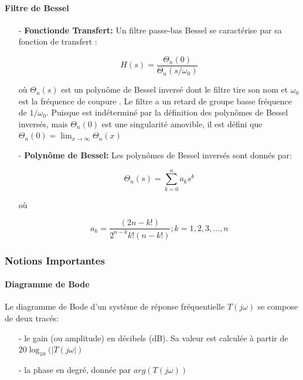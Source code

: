 \documentclass[conference,onecolumn]{IEEEtran}
\begin{document}
\paragraph{Filtre de Bessel}
\hfill
\medskip
\begin{itemize}
    \item[-] \textbf{Fonctionde Transfert:}
    Un filtre passe-bas Bessel se caractérise par sa fonction de transfert :

        \begin{equation}
            H(s) = \frac{\Theta_n(0)}{\Theta_n(s/\omega_0)}
        \end{equation}

    où $\Theta_n(s)$ est un polynôme de Bessel inversé dont le filtre tire son nom et $\omega_0$ est  la fréquence de coupure . Le filtre a un retard de groupe basse fréquence de $1/\omega_0$. Puisque est indéterminé par la définition des polynômes de Bessel inversés, mais $\Theta_n(0)$ est une singularité amovible, il est défini que $\Theta_n(0) =  \lim_{x\to\infty} \Theta_n(x)$

    \item[-] \textbf{Polynôme de Bessel:}
        Les polynômes de Bessel inversés sont donnés par: 

        \begin{equation}
            \Theta_n(s) =  \sum_{k=0}^{n} a_k s^k 
        \end{equation}

        où

        \begin{equation}
            a_k = \frac{(2n - k!)}{2^{n-k} k!(n-k!)}; k = 1,2,3,...,n
        \end{equation}
\end{itemize}

\subsubsection{Notions Importantes}
\paragraph{Diagramme de Bode}
Le diagramme de Bode d'un système de réponse fréquentielle $T(j\omega)$ se compose de deux tracés:

\begin{itemize}
    \item[-] le gain (ou amplitude) en décibels (dB). Sa valeur est calculée à partir de $20\log_{10}(|T(j\omega|)$

    \item[-] la phase en degré, donnée par $arg(T(j\omega))$
\end{itemize}
\end{document}
